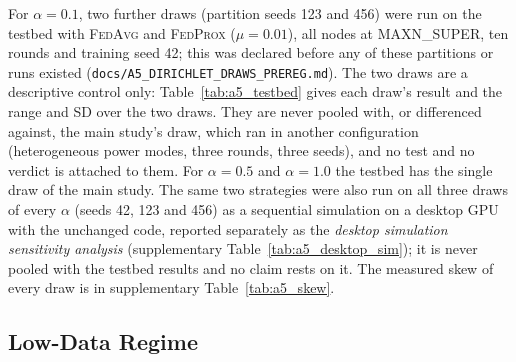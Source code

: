 \documentclass[journal]{IEEEtran}
\newcommand{\fedavg}{\textsc{FedAvg}}
\newcommand{\fedprox}{\textsc{FedProx}}
\begin{document}
For $\alpha=0.1$, two further draws (partition seeds 123 and 456) were run on the testbed with \fedavg{} and \fedprox{} ($\mu=0.01$), all nodes at MAXN\_SUPER, ten rounds and training seed 42; this was declared before any of these partitions or runs existed (\texttt{docs/A5\_DIRICHLET\_DRAWS\_PREREG.md}). The two draws are a descriptive control only: Table~\ref{tab:a5_testbed} gives each draw's result and the range and SD over the two draws. They are never pooled with, or differenced against, the main study's draw, which ran in another configuration (heterogeneous power modes, three rounds, three seeds), and no test and no verdict is attached to them. For $\alpha=0.5$ and $\alpha=1.0$ the testbed has the single draw of the main study. The same two strategies were also run on all three draws of every $\alpha$ (seeds 42, 123 and 456) as a sequential simulation on a desktop GPU with the unchanged code, reported separately as the \emph{desktop simulation sensitivity analysis} (supplementary Table~\ref{tab:a5_desktop_sim}); it is never pooled with the testbed results and no claim rests on it. The measured skew of every draw is in supplementary Table~\ref{tab:a5_skew}.


\subsection{Low-Data Regime}
\label{sec:lowdata}
\end{document}
